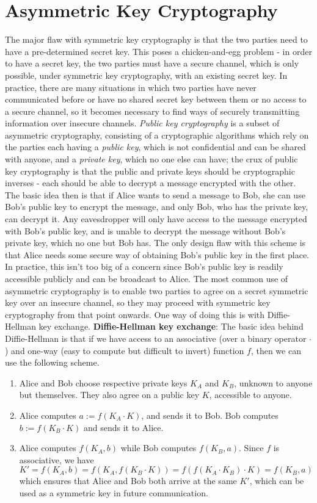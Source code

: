 \documentclass{article}
\begin{document}
\section{Asymmetric Key Cryptography}
The major flaw with symmetric key cryptography is that the two parties need to have a pre-determined secret key. This poses a chicken-and-egg problem - in order to have a secret key, the two parties must have a secure channel, which is only possible, under symmetric key cryptography, with an existing secret key. In practice, there are many situations in which two parties have never communicated before or have no shared secret key between them or no access to a secure channel, so it becomes necessary to find ways of securely transmitting information over insecure channels. \textit{Public key cryptography} is a subset of asymmetric cryptography, consisting of a cryptographic algorithms which rely on the parties each having a \textit{public key}, which is not confidential and can be shared with anyone, and a \textit{private key}, which no one else can have; the crux of public key cryptography is that the public and private keys should be cryptographic inverses - each should be able to decrypt a message encrypted with the other. The basic idea then is that if Alice wants to send a message to Bob, she can use Bob's public key to encrypt the message, and only Bob, who has the private key, can decrypt it. Any eavesdropper will only have access to the message encrypted with Bob's public key, and is unable to decrypt the message without Bob's private key, which no one but Bob has. The only design flaw with this scheme is that Alice needs some secure way of obtaining Bob's public key in the first place. In practice, this isn't too big of a concern since Bob's public key is readily accessible publicly and can be broadcast to Alice.
\newline
The most common use of asymmetric cryptography is to enable two parties to agree on a secret symmetric key over an insecure channel, so they may proceed with symmetric key cryptography from that point onwards. One way of doing this is with Diffie-Hellman key exchange.
\newline \newline
\textbf{Diffie-Hellman key exchange}: The basic idea behind Diffie-Hellman is that if we have access to an associative (over a binary operator $ \cdot $) and one-way (easy to compute but difficult to invert) function $ f $, then we can use the following scheme.
\begin{enumerate}
	\item Alice and Bob choose respective private keys $ K_A $ and $ K_B $, unknown to anyone but themselves. They also agree on a public key $ K $, accessible to anyone.
	\item Alice computes $ a := f(K_A \cdot K) $, and sends it to Bob. Bob computes $ b := f(K_B \cdot K) $ and sends it to Alice.
	\item Alice computes $ f(K_A, b) $ while Bob computes $ f(K_B, a) $. Since $ f $ is associative, we have
	$$ K' = f(K_A, b) = f(K_A, f(K_B \cdot K)) = f(f(K_A \cdot K_B) \cdot K) = f(K_B, a) $$
	which ensures that Alice and Bob both arrive at the same $ K' $, which can be used as a symmetric key in future communication.
\end{enumerate}
\end{document}

